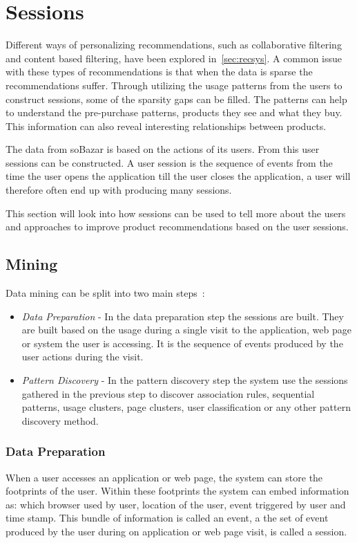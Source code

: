 
\section{Sessions}
    Different ways of personalizing recommendations, such as collaborative filtering and content based filtering, have been explored in~\ref{sec:recsys}.
    A common issue with these types of recommendations is that when the data is sparse the recommendations suffer.
    Through utilizing the usage patterns from the users to construct sessions, some of the sparsity gaps can be filled.
    The patterns can help to understand the pre-purchase patterns, products they see and what they buy.
    This information can also reveal interesting relationships between products.

    The data from soBazar is based on the actions of its users.
    From this user sessions can be constructed.
    A user session is the sequence of events from the time the user opens the application till the user closes the application, a user will therefore often end up with producing many sessions.

    This section will look into how sessions can be used to tell more about the users and approaches to improve product recommendations based on the user sessions.

\subsection{Mining}
    Data mining can be split into two main steps~\cite{Cho2002329}:
    \begin{itemize}
        \item \emph{Data Preparation} - In the data preparation step the sessions are built. They are built based on the usage during a single visit to the application, web page or system the user is accessing. It is the sequence of events produced by the user actions during the visit.
        \item \emph{Pattern Discovery} - In the pattern discovery step the system use the sessions gathered in the previous step to discover association rules, sequential patterns, usage clusters, page clusters, user classification or any other pattern discovery method.
    \end{itemize}

\subsubsection{Data Preparation} %
    \label{par:Data_Preparation}
    When a user accesses an application or web page, the system can store the footprints of the user.
    Within these footprints the system can embed information as: which browser used by user, location of the user, event triggered by user and time stamp.
    This bundle of information is called an event, a the set of event produced by the user during on application or web page visit, is called a session.

